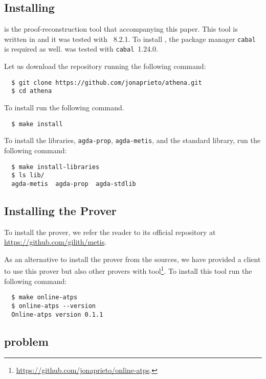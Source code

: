 \documentclass[../main.tex]{subfiles}
\begin{document}
\begin{subappendices}
\subsection{Installing \Athena}

\Athena is the proof-reconstruction tool that accompanying this paper.
This tool is written in \Haskell and it was tested with ~8.2.1.
To install \Athena, the package manager \verb!cabal! is required as well.
\Athena was tested with \verb!cabal!~1.24.0.

Let us download the \Athena repository running the following command:

\begin{verbatim}
  $ git clone https://github.com/jonaprieto/athena.git
  $ cd athena
\end{verbatim}

To install \Athena run the following command.

\begin{verbatim}
  $ make install
\end{verbatim}

To install the \Agda libraries, \verb!agda-prop!, \verb!agda-metis!, and
the \Agda standard library, run the following command:

\begin{verbatim}
  $ make install-libraries
  $ ls lib/
  agda-metis  agda-prop  agda-stdlib
\end{verbatim}

\subsection{Installing the \Metis Prover}

To install the \Metis prover, we refer the reader to its official
repository at \url{https://github.com/gilith/metis}.

As an alternative to install the prover from the \Metis sources,
we have provided a \Haskell client
to use this prover but also other provers with 
tool\footnote{\url{https://github.com/jonaprieto/online-atps}.}.
To install this tool run the following command:

\begin{verbatim}
  $ make online-atps
  $ online-atps --version
  Online-atps version 0.1.1
\end{verbatim}

\subsection{\TPTP problem}


\end{subappendices}
\end{document}
